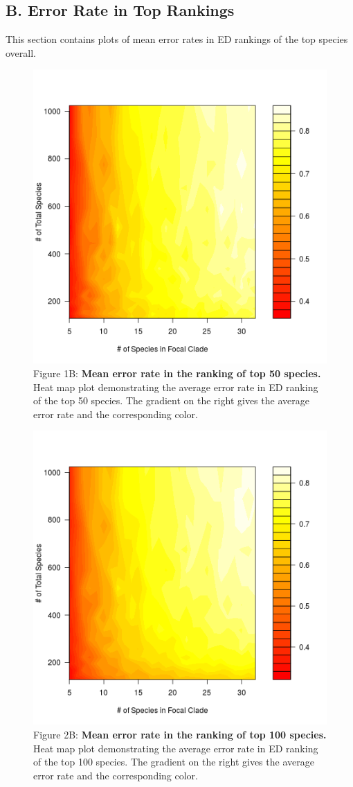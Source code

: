\documentclass[12pt,english]{article}
\begin{document}
\clearpage
\subsection*{B. Error Rate in Top Rankings}

This section contains plots of mean error rates in ED rankings of the top
species overall. 

\begin{figure}[!ht]
  \center
  \includegraphics[width=.5\textwidth]{errorRate50.png}
  \caption*{Figure 1B: \textbf{Mean error rate in the ranking of top 50 species.} Heat map
  plot demonstrating the average error rate in ED ranking of the top 50 species.
  The gradient on the right gives the average error rate and the corresponding
  color.}
\end{figure}

\begin{figure}[!ht]
  \center
  \includegraphics[width=.5\textwidth]{errorRate100.png}
  \caption*{Figure 2B: \textbf{Mean error rate in the ranking of top 100 species.} Heat map
  plot demonstrating the average error rate in ED ranking of the top 100 species.
  The gradient on the right gives the average error rate and the corresponding
  color.}
\end{figure}
\end{document}
